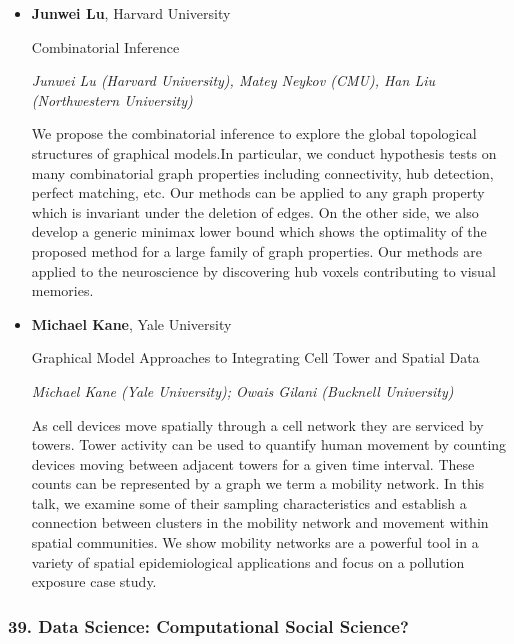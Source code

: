 \begin{itemize}
\item \textbf{Junwei Lu}, Harvard University

Combinatorial Inference

\emph{\footnotesize Junwei Lu (Harvard University), Matey Neykov (CMU), Han Liu (Northwestern University)}

We propose the combinatorial inference to explore the global topological structures of graphical models.In particular, we conduct hypothesis tests on many combinatorial graph properties including connectivity, hub detection, perfect matching, etc. Our methods can be applied to any graph property which is invariant under the deletion of edges. On the other side, we also develop a generic minimax lower bound which shows the optimality of the proposed method for a large family of graph properties. Our methods are applied to the neuroscience by discovering hub voxels contributing to visual memories.

\item \textbf{Michael Kane}, Yale University

Graphical Model Approaches to Integrating Cell Tower and Spatial Data

\emph{\footnotesize Michael Kane (Yale University); Owais Gilani (Bucknell University)}

As cell devices move spatially through a cell network they are serviced by towers. Tower activity can be used to quantify human movement by counting devices moving between adjacent towers for a given time interval. These counts can be represented by a graph we term a mobility network. In this talk, we examine some of their sampling characteristics and establish a connection between clusters in the mobility network and movement within spatial communities. We show mobility networks are a powerful tool in a variety of spatial epidemiological applications and focus on a pollution exposure case study.

\end{itemize}

\subsubsection*{39. Data Science: Computational Social Science?}

